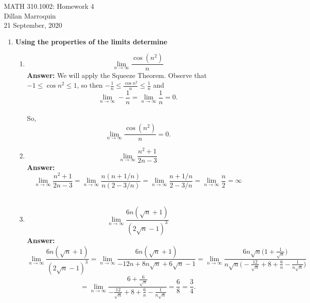\documentclass{article}
\begin{document}
    \noindent MATH 310.1002: Homework 4\\
    Dillan Marroquin\\
    21 September, 2020

    \begin{enumerate}[label=\Roman*.]
        \item \textbf{Using the properties of the limits determine}
        
        \begin{enumerate}[label = \arabic*.]
            \item \[\lim_{n\to \infty} \frac{\cos(n^2)}{n}\]
            \textbf{Answer: }We will apply the Squeeze Theorem. Observe that $-1 \leq \cos{n^2} \leq 1$, so then $-\frac{1}{n} \leq \frac{\cos{n^2}}{n} \leq \frac{1}{n}$ and 
                \[\lim_{n \to \infty} -\frac{1}{n} = \lim_{n \to \infty} \frac{1}{n} = 0.\]\\
            So,
                \[\lim_{n\to \infty} \frac{\cos(n^2)}{n} = 0.\]
            \item \[\lim_{n\to \infty} \frac{n^2+1}{2n-3}\]
            \textbf{Answer: }
                \[\lim_{n \to \infty} \frac{n^2+1}{2n-3} = \lim_{n \to \infty} \frac{n(n+1/n)}{n(2-3/n)} = \lim_{n \to \infty} \frac{n+1/n}{2-3/n} = \lim_{n \to \infty} \frac{n}{2} = \infty\]\\
            \item \[\lim_{n\to \infty} \frac{6n(\sqrt{n}+1)}{(2\sqrt{n}-1)^3}\]
            \textbf{Answer: }
                \[\lim_{n \to \infty} \frac{6n(\sqrt{n}+1)}{(2\sqrt{n}-1)^3} = \lim_{n \to \infty} \frac{6n(\sqrt{n}+1)}{-12n+8n\sqrt{n}+6\sqrt{n}-1} = \lim_{n \to \infty} \frac{6n\sqrt{n}\Big(1+\frac{1}{\sqrt{n}}\Big)}{n\sqrt{n}\Big(-\frac{12}{\sqrt{n}}+8+\frac{6}{n}-\frac{1}{n\sqrt{n}}\Big)}\]
                \[ = \lim_{n \to \infty} \frac{6+\frac{6}{\sqrt{n}} }{-\frac{12}{\sqrt{n}}+8+\frac{6}{n}-\frac{1}{n\sqrt{n}}} = \frac{6}{8} = \frac{3}{4}.\]\\
            

\end{enumerate}
\end{enumerate}
\end{document}
